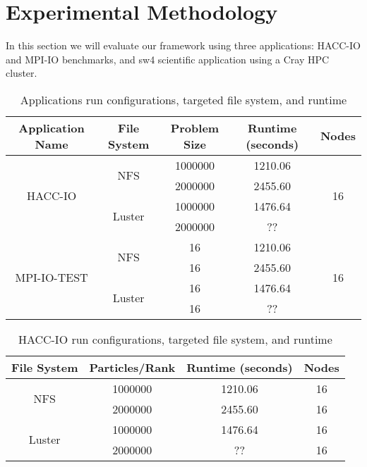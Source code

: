 \section{Experimental Methodology}\label{AA}
In this section we will evaluate our framework using three applications: HACC-IO and MPI-IO benchmarks, and sw4 scientific application using a Cray HPC cluster.

\renewcommand{\arraystretch}{1.2}
\begin{table}[]
	\centering
	\begin{tabular}{|c|c|c|c|c|}
		\hline
		Application Name & File System	&  Problem Size	& Runtime (seconds) &	Nodes \\ \hline
		\multirow{4}{*}{HACC-IO} & \multirow{2}{*}{NFS}	& 1000000	& 1210.06 &	\multirow{4}{*}{16} \\ \cline{3-4} 
		&& 2000000	& 2455.60 &	\\ \cline{2-4}
		& \multirow{2}{*}{Luster}	& 1000000	&  1476.64 & \\ \cline{3-4} 
		&& 2000000	&  ?? &	 \\ \hline
		
		\multirow{4}{*}{MPI-IO-TEST} & \multirow{2}{*}{NFS}	& 16	& 1210.06 &	\multirow{4}{*}{16} \\ \cline{3-4} 
		&& 16	& 2455.60 &	\\ \cline{2-4}
		& \multirow{2}{*}{Luster}	& 16	&  1476.64 & \\ \cline{3-4} 
		&& 16	&  ?? &	 \\ \hline

	\end{tabular}
	\caption{Applications run configurations, targeted file system, and runtime}
	\label{table:all-apps}
\end{table}


\begin{table}[]
	\centering
	\begin{tabular}{|c|c|c|c|}
		\hline
		File System	& Particles/Rank	& Runtime (seconds) &	Nodes \\ \hline
		\multirow{2}{*}{NFS}	& 1000000	& 1210.06 &	16\\ \cline{2-4} 
		& 2000000	& 2455.60 &	16\\ \hline
		\multirow{2}{*}{Luster}	& 1000000	&  1476.64 &16 \\ \cline{2-4} 
		& 2000000	&  ?? &	16 \\ \hline
	\end{tabular}
	\caption{HACC-IO run configurations, targeted file system, and runtime}
	\label{table:HACC}
\end{table}

